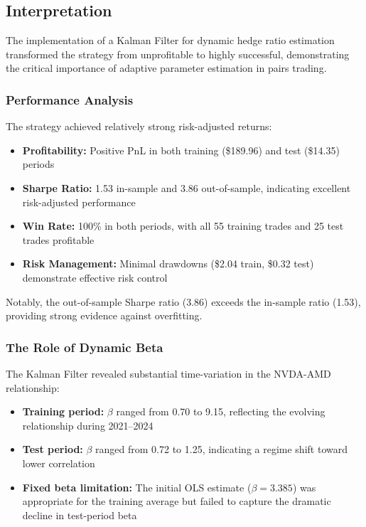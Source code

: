 \documentclass[11pt]{article}
\begin{document}
\subsection{Interpretation}

The implementation of a Kalman Filter for dynamic hedge ratio estimation transformed the strategy from unprofitable to highly successful, demonstrating the critical importance of adaptive parameter estimation in pairs trading.

\subsubsection{Performance Analysis}

The strategy achieved relatively strong risk-adjusted returns:

\begin{itemize}
\item \textbf{Profitability:} Positive PnL in both training (\$189.96) and test (\$14.35) periods
\item \textbf{Sharpe Ratio:} 1.53 in-sample and 3.86 out-of-sample, indicating excellent risk-adjusted performance
\item \textbf{Win Rate:} 100\% in both periods, with all 55 training trades and 25 test trades profitable
\item \textbf{Risk Management:} Minimal drawdowns (\$2.04 train, \$0.32 test) demonstrate effective risk control
\end{itemize}

Notably, the out-of-sample Sharpe ratio (3.86) exceeds the in-sample ratio (1.53), providing strong evidence against overfitting.

\subsubsection{The Role of Dynamic Beta}

The Kalman Filter revealed substantial time-variation in the NVDA-AMD relationship:

\begin{itemize}
\item \textbf{Training period:} $\beta$ ranged from 0.70 to 9.15, reflecting the evolving relationship during 2021–2024
\item \textbf{Test period:} $\beta$ ranged from 0.72 to 1.25, indicating a regime shift toward lower correlation
\item \textbf{Fixed beta limitation:} The initial OLS estimate ($\beta = 3.385$) was appropriate for the training average but failed to capture the dramatic decline in test-period beta
\end{itemize}
\end{document}
